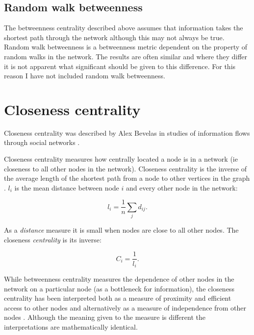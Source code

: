 \subsection{Random walk betweenness}
\label{sec: random walk betweenness}
The betweenness centrality described above assumes that information takes the shortest path through the network although this may not always be true. Random walk betweenness is a betweenness metric dependent on the property of random walks in the network. The results are often similar and where they differ it is not apparent what significant should be given to this difference\cite{newman2018networks}. For this reason I have not included random walk betweenness. 

\section{Closeness centrality}
\label{sec:closenesscentrality}
Closeness centrality was described by Alex Bevelas in studies of information flows through social networks \cite{bavelas1948mathematical}. 

Closeness centrality measures how centrally located a node is in a network (ie closeness to all other nodes in the network). Closeness centrality is the inverse of the average length of the shortest path from a node to other vertices in the graph \cite{freeman1978centrality}. $l_i$ is the mean distance between node $i$ and every other node in the network:

\begin{equation}
    l_i = \frac{1}{n} \sum_j d_{ij}.
\end{equation}

 As a \textit{distance} measure it is small when nodes are close to all other nodes. The closeness \textit{centrality} is its inverse:


\begin{equation}
    C_i = \frac{1}{l_i}.
\end{equation}
\cite{newman2018networks}

While betweenness centrality measures the dependence of other nodes in the network on a particular node (as a bottleneck for information), the closeness centrality has been interpreted both as a measure of proximity and efficient access to other nodes and alternatively as a measure of independence from other nodes \cite{brandes2016maintaining}. Although the meaning given to the measure is different the interpretations are mathematically identical.



